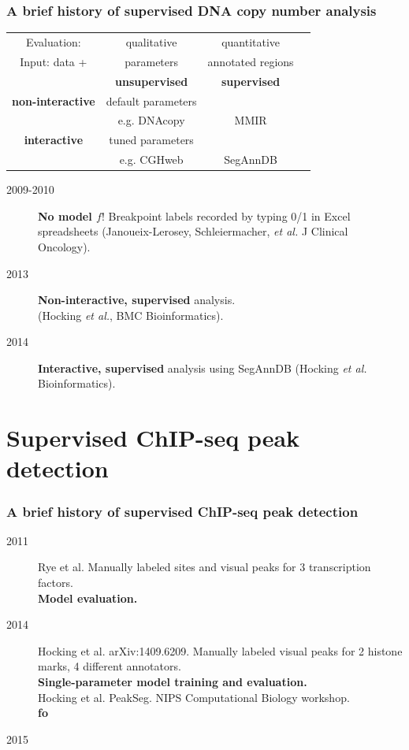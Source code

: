 \documentclass{beamer}
\begin{document}
\begin{frame}
  \frametitle{A brief history of supervised DNA copy number analysis}
  \begin{center}
      \begin{tabular}{c|c|c|c}
    Evaluation: & qualitative & quantitative \\
    Input: data + & parameters & annotated regions \\
    & \textbf{unsupervised} & \textbf{supervised} \\
    \hline
 \textbf{non-interactive}    & default parameters & &\\
    & e.g. DNAcopy & MMIR \\
    \hline
 \textbf{interactive}    & tuned parameters &  \\
    & e.g. CGHweb & SegAnnDB
  \end{tabular}
  \end{center}
  \begin{description}
  \item[2009-2010] \textbf{No model $f$}! Breakpoint labels recorded
    by typing 0/1 in Excel spreadsheets (Janoueix-Lerosey,
    Schleiermacher, \textit{et al.} J Clinical Oncology).
  \item[2013] \textbf{Non-interactive, supervised} analysis.
    \\(Hocking \textit{et al.}, BMC Bioinformatics).
  \item[2014] \textbf{Interactive, supervised} analysis using SegAnnDB
    (Hocking \textit{et al.} Bioinformatics).
  \end{description}
\end{frame}

\section{Supervised ChIP-seq peak detection}

\begin{frame}
  \frametitle{A brief history of supervised ChIP-seq peak detection}
  \begin{description}
  \item[2011] Rye et al. Manually labeled sites and visual peaks for 3
    transcription factors.\\
    \textbf{Model evaluation.}
  \item[2014] Hocking et al. arXiv:1409.6209. Manually labeled visual
    peaks for 2 histone marks, 4 different annotators.
    \\
    \textbf{Single-parameter model training and evaluation.}\\
    Hocking et al. PeakSeg. NIPS Computational Biology workshop.\\
    \textbf{fo}
  \item[2015] 
  \end{description}
\end{frame}
\end{document}
